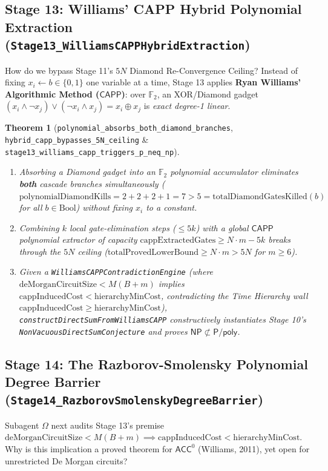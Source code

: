 \documentclass[11pt,a4paper]{article}
\theoremstyle{plain}
\newtheorem{theorem}{Theorem}[section]
\theoremstyle{definition}
\theoremstyle{remark}
\newcommand{\lean}[1]{\texttt{\textcolor{slate}{#1}}}
\newcommand{\CAPP}{\mathsf{CAPP}}
\newcommand{\NP}{\mathsf{NP}}
\newcommand{\Ppoly}{\mathsf{P/poly}}
\newcommand{\ACC}{\mathsf{ACC}}
\newcommand{\F}{\mathbb{F}}
\begin{document}
\subsection{Stage 13: Williams' CAPP Hybrid Polynomial Extraction (\lean{Stage13\_WilliamsCAPPHybridExtraction})}
How do we bypass Stage 11's $5N$ Diamond Re-Convergence Ceiling? Instead of fixing $x_i \leftarrow b \in \{0,1\}$ one variable at a time, Stage 13 applies \textbf{Ryan Williams' Algorithmic Method ($\CAPP$)}: over $\F_2$, an XOR/Diamond gadget $(x_i \land \neg x_j) \lor (\neg x_i \land x_j) = x_i \oplus x_j$ is \emph{exact degree-1 linear}.

\begin{theorem}[\lean{polynomial\_absorbs\_both\_diamond\_branches}, \lean{hybrid\_capp\_bypasses\_5N\_ceiling} \& \lean{stage13\_williams\_capp\_triggers\_p\_neq\_np}]
\begin{enumerate}[noitemsep]
    \item Absorbing a Diamond gadget into an $\F_2$ polynomial accumulator eliminates \textbf{both} cascade branches simultaneously ($\mathrm{polynomialDiamondKills} = 2 + 2 + 2 + 1 = 7 > 5 = \mathrm{totalDiamondGatesKilled}(b)$ for all $b \in \mathrm{Bool}$) without fixing $x_i$ to a constant.
    \item Combining $k$ local gate-elimination steps ($\le 5k$) with a global $\CAPP$ polynomial extractor of capacity $\mathrm{cappExtractedGates} \ge N \cdot m - 5k$ breaks through the $5N$ ceiling ($\mathrm{totalProvedLowerBound} \ge N \cdot m > 5N$ for $m \ge 6$).
    \item Given a \lean{WilliamsCAPPContradictionEngine} (where $\mathrm{deMorganCircuitSize} < M(B+m)$ implies $\mathrm{cappInducedCost} < \mathrm{hierarchyMinCost}$, contradicting the Time Hierarchy wall $\mathrm{cappInducedCost} \ge \mathrm{hierarchyMinCost}$), \lean{constructDirectSumFromWilliamsCAPP} constructively instantiates Stage 10's \lean{NonVacuousDirectSumConjecture} and proves $\NP \not\subset \Ppoly$.
\end{enumerate}
\end{theorem}

\subsection{Stage 14: The Razborov-Smolensky Polynomial Degree Barrier (\lean{Stage14\_RazborovSmolenskyDegreeBarrier})}
Subagent $\Omega$ next audits Stage 13's premise $\mathrm{deMorganCircuitSize} < M(B+m) \implies \mathrm{cappInducedCost} < \mathrm{hierarchyMinCost}$. Why is this implication a proved theorem for $\ACC^0$ (Williams, 2011), yet open for unrestricted De Morgan circuits?
\end{document}
